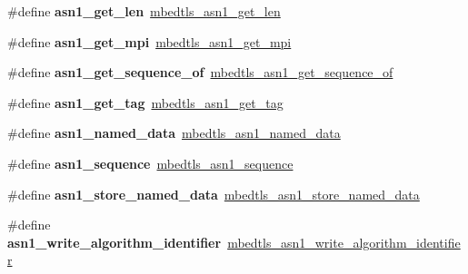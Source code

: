 \begin{DoxyCompactItemize}
\#define {\bfseries asn1\+\_\+get\+\_\+len}~\mbox{\hyperlink{asn1_8h_ad45c1d0ed3694fe903342cb32647bfb1}{mbedtls\+\_\+asn1\+\_\+get\+\_\+len}}
\item 
\mbox{\label{compat-1_83_8h_a9c448bb0b286fb619c5875aea50be802}} 
\#define {\bfseries asn1\+\_\+get\+\_\+mpi}~\mbox{\hyperlink{asn1_8h_a48e235454b64aa67c9472a6579706b05}{mbedtls\+\_\+asn1\+\_\+get\+\_\+mpi}}
\item 
\mbox{\label{compat-1_83_8h_a2219e200e06da45e44553075123686c4}} 
\#define {\bfseries asn1\+\_\+get\+\_\+sequence\+\_\+of}~\mbox{\hyperlink{asn1_8h_a872d62128956b3574bb0e681536c0d6b}{mbedtls\+\_\+asn1\+\_\+get\+\_\+sequence\+\_\+of}}
\item 
\mbox{\label{compat-1_83_8h_add5e2510dd9b89b7be429afe38c7b081}} 
\#define {\bfseries asn1\+\_\+get\+\_\+tag}~\mbox{\hyperlink{asn1_8h_ae8d7dd42a3b99b61d2ef60bc0c2eaf0d}{mbedtls\+\_\+asn1\+\_\+get\+\_\+tag}}
\item 
\mbox{\label{compat-1_83_8h_a80ef3a4a6900d569afa2450c35cf65ab}} 
\#define {\bfseries asn1\+\_\+named\+\_\+data}~\mbox{\hyperlink{structmbedtls__asn1__named__data}{mbedtls\+\_\+asn1\+\_\+named\+\_\+data}}
\item 
\mbox{\label{compat-1_83_8h_ac1ed137fa8bb27403fa3cfb8b640aa4c}} 
\#define {\bfseries asn1\+\_\+sequence}~\mbox{\hyperlink{structmbedtls__asn1__sequence}{mbedtls\+\_\+asn1\+\_\+sequence}}
\item 
\mbox{\label{compat-1_83_8h_a6ffe8c9825de3265298a4d2fab723440}} 
\#define {\bfseries asn1\+\_\+store\+\_\+named\+\_\+data}~\mbox{\hyperlink{asn1write_8h_a0ad16ddefc9aa0948e84dcdd1e29ebf6}{mbedtls\+\_\+asn1\+\_\+store\+\_\+named\+\_\+data}}
\item 
\mbox{\label{compat-1_83_8h_ae8457947de0fbbed4e78dafef2a99be2}} 
\#define {\bfseries asn1\+\_\+write\+\_\+algorithm\+\_\+identifier}~\mbox{\hyperlink{asn1write_8h_a87b24d328654c5e8d17ffe3b0192ecb8}{mbedtls\+\_\+asn1\+\_\+write\+\_\+algorithm\+\_\+identifier}}
\item 
\mbox{\label{compat-1_83_8h_a8f2c29b07da0fc888abcb02f819228d4}} 

\end{DoxyCompactItemize}
